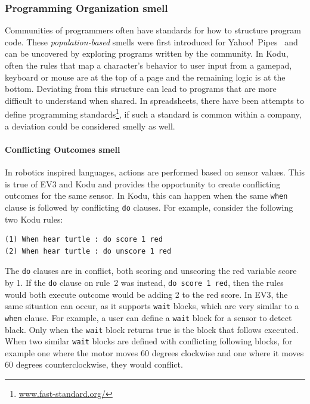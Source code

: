 \documentclass[conference]{IEEEtran}
\begin{document}
\subsubsection{Programming Organization smell}
Communities of programmers often have standards for how to structure program code. These \emph{population-based} smells were first introduced for Yahoo!\ Pipes~\cite{StoleeTSE2013} and can be uncovered by exploring programs written by the community. In Kodu, often the rules that map a character's behavior to user input from a gamepad, keyboard or mouse are at the top of a page and the remaining logic is at the bottom. Deviating from this structure can lead to programs that are more difficult to understand when shared. In spreadsheets, there have been attempts to define programming standards\footnote{\url{www.fast-standard.org/}}, if such a standard is common within a company, a deviation could be considered smelly as well.



\paragraph{Conflicting Outcomes smell}
In robotics inspired languages, actions are performed based on sensor values. This is true of EV3 and Kodu and  provides the opportunity to create conflicting outcomes for the same sensor. 
In Kodu, this can happen when the same \texttt{when} clause is followed by conflicting \texttt{do} clauses. For example, consider the following two Kodu rules:
\begin{verbatim}
(1) When hear turtle : do score 1 red
(2) When hear turtle : do unscore 1 red
\end{verbatim}
\noindent The {\tt do} clauses are in conflict, both scoring and unscoring the red variable score by 1. If the {\tt do} clause on rule~2 was instead, {\tt do score 1 red}, then the rules would both execute outcome would be adding 2 to the red score. 
In EV3, the same situation can occur, as it supports \texttt{wait} blocks, which are very similar to a \texttt{when} clause. For example, a user can define a \texttt{wait} block for a sensor to detect black. Only when the \texttt{wait} block returns true is the block that follows executed. 
When two similar \texttt{wait} blocks are defined with conflicting following blocks, for example one where the motor moves 60 degrees clockwise and one where it moves 60 degrees counterclockwise, they would conflict.
\end{document}
